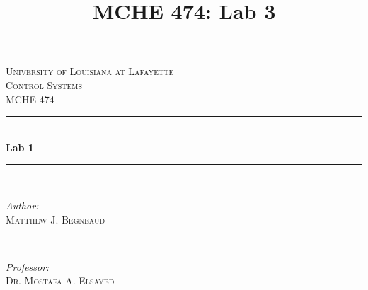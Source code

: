 \documentclass[12pt]{article}
\title{MCHE 474: Lab 3}
\begin{document}




\begin{titlepage}

\newcommand{\HRule}{\rule{\linewidth}{0.5mm}} %

\center %
 

\textsc{\LARGE University of Louisiana at Lafayette}\\[1.5cm] %
\textsc{\Large Control Systems}\\[0.5cm] %
\textsc{\large MCHE 474}\\[0.5cm] %


\HRule \\[0.4cm]
{ \huge \bfseries Lab 1}\\[0.4cm] %
\HRule \\[1.5cm]
 

\begin{minipage}{0.4\textwidth}
\begin{flushleft} \large
\emph{Author:}\\
\textsc{Matthew J. Begneaud} \\%
\end{flushleft}
\end{minipage}
~
\begin{minipage}{0.4\textwidth}
\begin{flushright} \large
\emph{Professor:} \\
\textsc{Dr. Mostafa A. Elsayed} %
\end{flushright}
\end{minipage}\\[1.5cm]


\end{titlepage}
\end{document}
